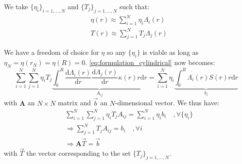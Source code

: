 We take $\{\eta_i\}_{i=1,\ldots,N}$ and $\{T_j\}_{j=1,\ldots,N}$ such that:
\begin{equation}
    \begin{aligned}
        & \eta(r) \approx \sum_{i=1}^N \eta_i \Lambda_i(r) \\
        & T(r) \approx \sum_{j=1}^N T_j \Lambda_j(r)
    \end{aligned}
\end{equation}

We have a freedom of choice for $\eta$ so any $\{\eta_i\}$ is viable as long as $\eta_N = \eta(r_N) = \eta(R) = 0$.
\autoref{eq:formulation_cylindrical} now becomes:
\begin{equation}
    \sum_{i=1}^{N} \sum_{j=1}^{N} \eta_i T_j \underbrace{\int_0^R \frac{\mathrm{d} \Lambda_i(r)}{\mathrm{d} r} \frac{\mathrm{d} \Lambda_j(r)}{\mathrm{d} r} \kappa(r)  r \mathrm{d}r}_{A_{ij}}  = \sum_{i=1}^{N} \eta_i \underbrace{\int_0^R \Lambda_i(r) S(r) r \mathrm{d}r}_{b_i}
    \label{eq:matrix_defs}
\end{equation}
with $\mathbf{A}$ an $N\times N$ matrix and $\vec{b}$ an $N$-dimensional vector. We thus have:
\begin{equation}
    \begin{aligned}
        & \sum_{i=1}^{N} \sum_{j=1}^{N} \eta_i T_j A_{ij}  = \sum_{i=1}^{N} \eta_i b_i \quad , \forall \{\eta_i\} \\
        & \Rightarrow \sum_{j=1}^{N} T_j A_{ij} = b_i \quad , \forall i \\
        & \Rightarrow \mathbf{A} \vec{T} = \vec{b}
    \end{aligned}
    \label{eq:system_of_equations}
\end{equation}
with $\vec{T}$ the vector corresponding to the set $\{T_j\}_{j=1,\ldots,N}$.

